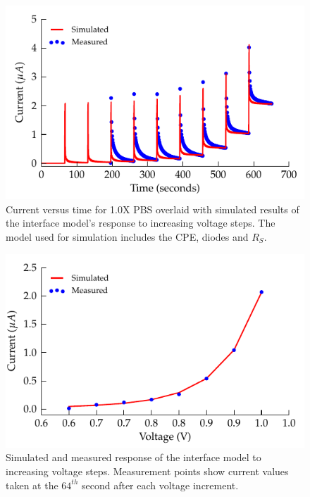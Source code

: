 \documentclass[journal, a4paper]{IEEEtran}
\begin{document}
\begin{figure}
    \begin{center}
        \includegraphics{graphics/faradaic_currentVsTime_IEEE}
    \end{center}
    \caption{Current versus time for 1.0X PBS overlaid with simulated results of the interface model's response to increasing voltage steps. The model used for simulation includes the CPE, diodes and $R_{S}$.}
    \label{fig:faradaic_currentVsTime}
\end{figure}

\begin{figure}
    \begin{center}
        \includegraphics{graphics/faradaic_currentVsVoltage_IEEE}
    \end{center}
    \caption{Simulated and measured response of the interface model to increasing voltage steps. Measurement points show current values taken at the $64^{th}$ second after each voltage increment.}
    \label{fig:faradaic_currentVsVoltage}
\end{figure}
\end{document}
